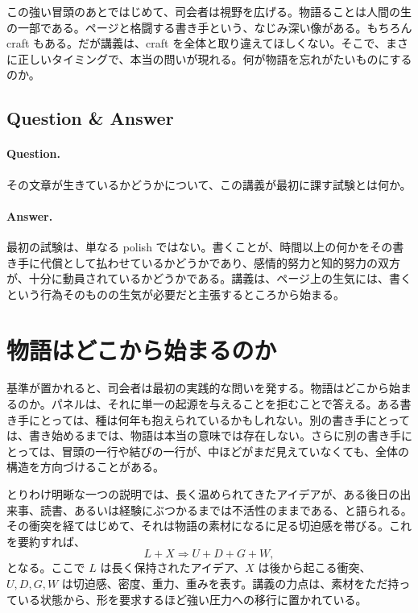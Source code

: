 この強い冒頭のあとではじめて、司会者は視野を広げる。物語ることは人間の生の一部である。ページと格闘する書き手という、なじみ深い像がある。もちろん craft もある。だが講義は、craft を全体と取り違えてほしくない。そこで、まさに正しいタイミングで、本当の問いが現れる。何が物語を忘れがたいものにするのか。

\subsection{Question \& Answer}

\paragraph{Question.} その文章が生きているかどうかについて、この講義が最初に課す試験とは何か。

\paragraph{Answer.} 最初の試験は、単なる polish ではない。書くことが、時間以上の何かをその書き手に代償として払わせているかどうかであり、感情的努力と知的努力の双方が、十分に動員されているかどうかである。講義は、ページ上の生気には、書くという行為そのものの生気が必要だと主張するところから始まる。

\section{物語はどこから始まるのか}

基準が置かれると、司会者は最初の実践的な問いを発する。物語はどこから始まるのか。パネルは、それに単一の起源を与えることを拒むことで答える。ある書き手にとっては、種は何年も抱えられているかもしれない。別の書き手にとっては、書き始めるまでは、物語は本当の意味では存在しない。さらに別の書き手にとっては、冒頭の一行や結びの一行が、中ほどがまだ見えていなくても、全体の構造を方向づけることがある。

とりわけ明晰な一つの説明では、長く温められてきたアイデアが、ある後日の出来事、読書、あるいは経験にぶつかるまでは不活性のままである、と語られる。その衝突を経てはじめて、それは物語の素材になるに足る切迫感を帯びる。これを要約すれば、
\begin{equation}
L + X \Rightarrow U + D + G + W,
\end{equation}
となる。ここで \(L\) は長く保持されたアイデア、\(X\) は後から起こる衝突、\(U,D,G,W\) は切迫感、密度、重力、重みを表す。講義の力点は、素材をただ持っている状態から、形を要求するほど強い圧力への移行に置かれている。

